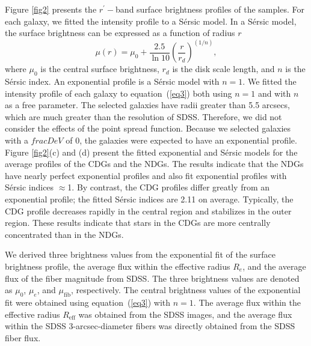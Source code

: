\documentclass[fleqn,usenatbib]{mnras}
\begin{document}
Figure \ref{fig2} presents the $r^{\prime}-$band surface brightness profiles of the samples.
For each galaxy, we fitted the intensity profile to a S{\'e}rsic model.
In a S{\'e}rsic model, the surface brightness can be expressed as a function of radius $r$ \citep[][]{2005PASA...22..118G} 
\begin{equation}
\label{eq3}
    \mu(r) = \mu_0 + \frac{2.5}{\ln{10}} (\frac{r}{r_d})^{(1/n)},
\end{equation}
where $\mu_0$ is the central surface brightness, $r_d$ is the disk scale length, and $n$ is the S{\'e}rsic index.
An exponential profile is a S{\'e}rsic model with $n=1$.
We fitted the intensity profile of each galaxy to equation~(\ref{eq3}) both using $n=1$ and with $n$ as a free parameter.
The selected galaxies have radii greater than 5.5 arcsecs, which are much greater than the resolution of SDSS.
Therefore, we did not consider the effects of the point spread function.
Because we selected galaxies with a $fracDeV$ of 0, the galaxies were expected to have an exponential profile.
Figure \ref{fig2}(c) and (d) present the fitted exponential and S{\'e}rsic models for the average profiles of the CDGs and the NDGs.
The results indicate that the NDGs have nearly perfect exponential profiles and also fit exponential profiles with S{\'e}rsic indices $\approx$1.
By contrast, the CDG profiles differ greatly from an exponential profile; the fitted S{\'e}rsic indices are 2.11 on average.
Typically, the CDG profile decreases rapidly in the central region and stabilizes in the outer region.
These results indicate that stars in the CDGs are more centrally concentrated than in the NDGs.

We derived three brightness values from the exponential fit of the surface brightness profile, the average flux within the effective radius $R_e$, and the average flux of the fiber magnitude from SDSS.
The three brightness values are denoted as $\mu_0$, $\mu_e$, and $\mu_\mathrm{fib}$, respectively.
The central brightness values of the exponential fit were obtained using equation~(\ref{eq3}) with $n=1$.
The average flux within the effective radius $R_\mathrm{eff}$ was obtained from the SDSS images, and the average flux within the SDSS 3-arcsec-diameter fibers was directly obtained from the SDSS fiber flux.
\end{document}
